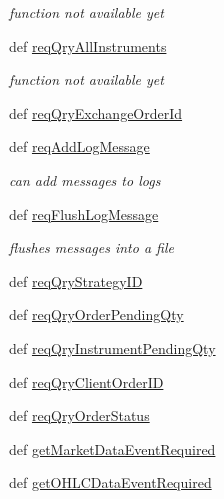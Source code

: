 \begin{DoxyCompactItemize}
\begin{DoxyCompactList}\small\item\em function not available yet \item\end{DoxyCompactList}\item 
def \hyperlink{classmuTradePyBase_1_1CustomStrategy_a4f86b387e2a4566bc34e49a6eed18683}{reqQryAllInstruments}
\begin{DoxyCompactList}\small\item\em function not available yet \item\end{DoxyCompactList}\item 
def \hyperlink{classmuTradePyBase_1_1CustomStrategy_a20cce64603fa41524a94e2c28231bb0d}{reqQryExchangeOrderId}
\item 
def \hyperlink{classmuTradePyBase_1_1CustomStrategy_aa1306213f1bd45974a0fdd370be58d22}{reqAddLogMessage}
\begin{DoxyCompactList}\small\item\em can add messages to logs \item\end{DoxyCompactList}\item 
def \hyperlink{classmuTradePyBase_1_1CustomStrategy_a15a75b52429194a1656ae5327df1d20e}{reqFlushLogMessage}
\begin{DoxyCompactList}\small\item\em flushes messages into a file \item\end{DoxyCompactList}\item 
def \hyperlink{classmuTradePyBase_1_1CustomStrategy_a17c1786aa8fe23b8edb06dd064a2ff11}{reqQryStrategyID}
\item 
def \hyperlink{classmuTradePyBase_1_1CustomStrategy_a1b353f46dffc755667c896b669a638fa}{reqQryOrderPendingQty}
\item 
def \hyperlink{classmuTradePyBase_1_1CustomStrategy_a5a88d3465201abc5a438f8a3cbd72149}{reqQryInstrumentPendingQty}
\item 
def \hyperlink{classmuTradePyBase_1_1CustomStrategy_a498436149088a84055d2d3793775956a}{reqQryClientOrderID}
\item 
def \hyperlink{classmuTradePyBase_1_1CustomStrategy_a0127eda99cf09acb990a26ccc63ac617}{reqQryOrderStatus}
\item 
def \hyperlink{classmuTradePyBase_1_1CustomStrategy_aaed973e7d7ddba726cde0eccd20cca27}{getMarketDataEventRequired}
\item 
def \hyperlink{classmuTradePyBase_1_1CustomStrategy_a67150cfa4a93fd0e33cfdb515264985c}{getOHLCDataEventRequired}
\end{DoxyCompactItemize}
